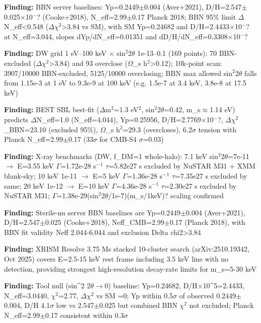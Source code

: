 \documentclass[11pt,a4paper]{article}
\begin{document}
\textbf{Finding:} BBN server baselines: Yp=0.2449$\pm$0.004 (Aver+2021), D/H=2.547$\pm$0.025$\times$10$^-$? (Cooke+2018), N\_eff=2.99$\pm$0.17 Planck 2018; BBN 95\% limit $\Delta$N\_eff\textless{}0.548 ($\Delta$$\chi$$^2$\textgreater{}3.84 vs SM), with SM Yp=0.24682 and D/H=2.4433$\times$10$^-$? at N\_eff=3.044, slopes dYp/dN\_eff=0.01351 and dD/H/dN\_eff=0.3308$\times$10$^-$?

\textbf{Finding:} DW grid 1 eV--100 keV $\times$ sin$^2$2$\theta$ 1e-13--0.1 (169 points): 70 BBN-excluded ($\Delta$$\chi$$^2$\textgreater{}3.84) and 93 overclose ($\Omega$\_s h$^2$\textgreater{}0.12); 10k-point scan: 3907/10000 BBN-excluded, 5125/10000 overclosing; BBN max allowed sin$^2$2$\theta$ falls from 1.15e-3 at 1 eV to 9.3e-9 at 100 keV (e.g. 1.5e-7 at 3.4 keV, 3.8e-8 at 17.5 keV)

\textbf{Finding:} BEST SBL best-fit ($\Delta$m$^2$=1.3 eV$^2$, sin$^2$2$\theta$=0.42, m\_s$\approx$1.14 eV) predicts $\Delta$N\_eff=1.0 (N\_eff=4.044), Yp=0.25956, D/H=2.7769$\times$10$^-$?, $\Delta$$\chi$$^2$\_BBN=23.10 (excluded 95\%), $\Omega$\_s h$^2$=29.3 (overcloses), 6.2$\sigma$ tension with Planck N\_eff=2.99$\pm$0.17 (33$\sigma$ for CMB-S4 $\sigma$=0.03)

\textbf{Finding:} X-ray benchmarks (DW, f\_DM=1 whole-halo): 7.1 keV sin$^2$2$\theta$=7e-11 $\to$ E=3.55 keV $\Gamma$=1.72e-28 s$^-$$^1$ $\tau$=5.82e27 s excluded by NuSTAR M31 + XMM blank-sky; 10 keV 1e-11 $\to$ E=5 keV $\Gamma$=1.36e-28 s$^-$$^1$ $\tau$=7.35e27 s excluded by same; 20 keV 1e-12 $\to$ E=10 keV $\Gamma$=4.36e-28 s$^-$$^1$ $\tau$=2.30e27 s excluded by NuSTAR M31; $\Gamma$=1.38e-29(sin$^2$2$\theta$/1e-7)(m\_s/1keV)? scaling confirmed

\textbf{Finding:} Sterile-nu server BBN baselines are Yp=0.2449$\pm$0.004 (Aver+2021), D/H=2.547$\pm$0.025 (Cooke+2018), Neff\_CMB=2.99$\pm$0.17 (Planck 2018), with BBN fit validity Neff 2.044-6.044 and exclusion Delta chi2\textgreater{}3.84

\textbf{Finding:} XRISM Resolve 3.75 Ms stacked 10-cluster search (arXiv:2510.19342, Oct 2025) covers E=2.5-15 keV rest frame including 3.5 keV line with no detection, providing strongest high-resolution decay-rate limits for m\_s=5-30 keV

\textbf{Finding:} Tool null (sin\textasciicircum{}2 2$\theta$$\to$0) baseline: Yp=0.24682, D/H$\times$10\textasciicircum{}5=2.4433, N\_eff=3.0440, $\chi$$^2$=2.77, $\Delta$$\chi$$^2$ vs SM =0; Yp within 0.5$\sigma$ of observed 0.2449$\pm$0.004, D/H 4.1$\sigma$ low vs 2.547$\pm$0.025 but combined BBN $\chi$$^2$ not excluded; Planck N\_eff=2.99$\pm$0.17 consistent within 0.3$\sigma$
\end{document}
